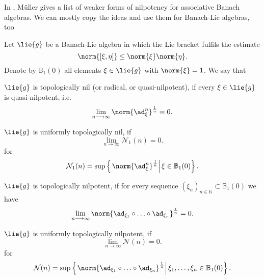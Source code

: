In \cite{mueller:1994a}, M\"uller gives a list of weaker forms of nilpotency for 
associative Banach algebras. We can mostly copy the ideas and use them for 
Banach-Lie algebras, too
\begin{definition}
	Let $\lie{g}$ be a Banach-Lie algebra in which the Lie bracket fulfils the 
	estimate
	\begin{equation*}
		\norm{ [\xi, \eta] }
		\leq
		\norm{\xi}
		\norm{\eta}.
	\end{equation*}
	Denote by $\mathbb{B}_1(0)$ all elements $\xi \in \lie{g}$ with 
	$\norm{\xi} = 1$. We say that
	\begin{definitionlist}
		\item
		$\lie{g}$ is topologically nil (or radical, or quasi-nilpotent), if
		every $\xi \in \lie{g}$ is quasi-nilpotent, i.e.
		\begin{equation*}
			\lim_{n \longrightarrow \infty}
			\norm{\ad_{\xi}^n}^{\frac{1}{n}}
			=
			0.
		\end{equation*}
		
		\item
		$\lie{g}$ is uniformly topologically nil, if
		\begin{equation*}
			\lim_{n \longrightarrow \infty}
			\mathcal{N}_1(n)
			=
			0.
		\end{equation*}
		for
		\begin{equation}
			\mathcal{N}_1(n)
			=
			\sup \left\{ 
			\left.
				\norm{ \ad_{\xi}^n}^{\frac{1}{n}} 
			\right|
				\xi \in \mathbb{B}_1(0)
			\right\}.
		\end{equation}
		
		\item
		$\lie{g}$ is topologically nilpotent, if for every sequence
		$(\xi_n)_{n \in \mathbb{N}} \subset \mathbb{B}_1(0)$ we have
		\begin{equation*}
			\lim_{n \longrightarrow \infty}
			\norm{ 
				\ad_{\xi_1} \circ \ldots \circ \ad_{\xi_n}
			}^{\frac{1}{n}}
			=
			0.
		\end{equation*}
		
		\item
		$\lie{g}$ is uniformly topologically nilpotent, if
		\begin{equation*}
			\lim_{n \longrightarrow \infty}
			\mathcal{N}(n)
			=
			0.
		\end{equation*}
		for
		\begin{equation}
			\mathcal{N}(n)
			=
			\sup \left\{ 
			\left.
				\norm{ 
					\ad_{\xi_1} \circ \ldots \circ \ad_{\xi_n}
				}^{\frac{1}{n}} 
			\right|
				\xi_1, \ldots, \xi_n \in \mathbb{B}_1(0)
			\right\}.
		\end{equation}
	\end{definitionlist}
\end{definition}
